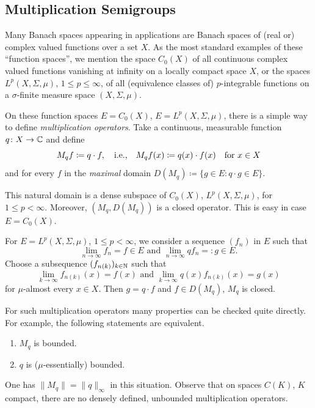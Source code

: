\subsection{Multiplication Semigroups}\label{subsec:a1-2.3}%
Many Banach spaces appearing in applications are Banach spaces of (real or) complex valued functions over a set $X$.
As the most standard examples of these \enquote{function spaces}, we mention the space $C_{0}(X)$ of all continuous complex valued functions vanishing at infinity on a locally compact space $X$, or the spaces $L^{p}(X,\Sigma,\mu)$, $1 \leq p \leq \infty$, of all (equivalence classes of) $p$-integrable functions on a $\sigma$-finite measure space $(X,\Sigma,\mu)$.

On these function spaces $E = C_{0}(X)$, \resp $E = L^{p}(X,\Sigma,\mu)$, there is a simple way to define \emph{multiplication operators}.
Take a continuous, \resp measurable function $q \colon X \to \mathbb{C}$ and define
\[
    M_{q}f \coloneq q \cdot f, \quad \text{i.e.,} \quad M_{q}f(x) 
    \coloneq q(x) 	\cdot f(x) \quad \text{for } x \in X 
\]
and for every $f$ in the \emph{maximal} domain $D(M_{q}) \coloneq \{g \in E \colon q \cdot g \in E\}$.

This natural domain is a dense subspace of\/ $C_{0}(X)$, \resp $L^{p}(X,\Sigma,\mu)$, for $1 \leq p < \infty$.
Moreover, $(M_{q},D(M_{q}))$ is a closed operator.
This is easy in case $E = C_{0}(X)$.

For $E = L^{p}(X,\Sigma,\mu)$, $1 \leq p < \infty$, we consider a sequence $(f_{n})$ in  $E$ such that 
%
\[
	\lim_{n \to \infty} f_{n} = f \in E \text{ and } \lim_{n \to \infty} qf_{n} = \colon g \in E .
\]
%
Choose a subsequence $(f_{n(k)})_{k \in \mathbb{N}}$ such that 
%
\[
	\lim_{k \to \infty} f_{n(k)}(x) = f(x) \text{ and } \lim_{k \to \infty} q(x)f_{n(k)}(x) = g(x)
\]
for $\mu$-almost every $x \in X$.
Then $g = q \cdot f$ and $f \in D(M_{q})$, \ie $M_{q}$ is closed.

For such multiplication operators many properties can be checked quite directly.
For example, the following statements are equivalent.
\begin{enumerate}[\upshape (a)]
\item 
$M_{q}$ is bounded.

\item 
$q$ is ($\mu$-essentially) bounded.
\end{enumerate}
One has $\|M_{q}\| = \|q\|_{\infty}$ in this situation.
Observe that on spaces $C(K)$, $K$ compact, there are no densely defined, unbounded multiplication operators.

